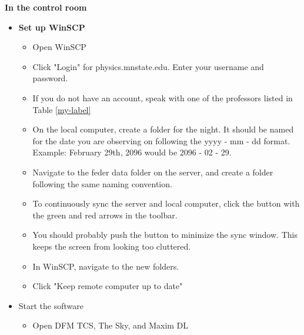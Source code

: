 \documentclass[letterpaper, 12pt]{report}
\begin{document}
{\large\textbf{In the control room}}
\begin{itemize}
	\item \textbf{Set up WinSCP}
	\begin{itemize}
		\item Open WinSCP
		\item Click "Login" for physics.mnstate.edu. Enter your username and password.
		\item If you do not have an account, speak with one of the professors listed in Table \ref{my-label}
		\item On the local computer, create a folder for the night. It should be named for the date you are observing on following the yyyy - mm - dd format. Example: February 29th, 2096 would be 2096 - 02 - 29.
		\item Navigate to the feder data folder on the server, and create a folder following the same naming convention.
		\item To continuously sync the server and local computer, click the button with the green and red arrows in the toolbar.
		\item You should probably push the button to minimize the sync window. This keeps the screen from looking too cluttered.
		\item In WinSCP, navigate to the new folders.
		\item Click "Keep remote computer up to date"
	\end{itemize}
	\item Start the software
	\begin{itemize}
		\item Open DFM TCS, The Sky, and Maxim DL
	\end{itemize}

\end{itemize}
\end{document}
